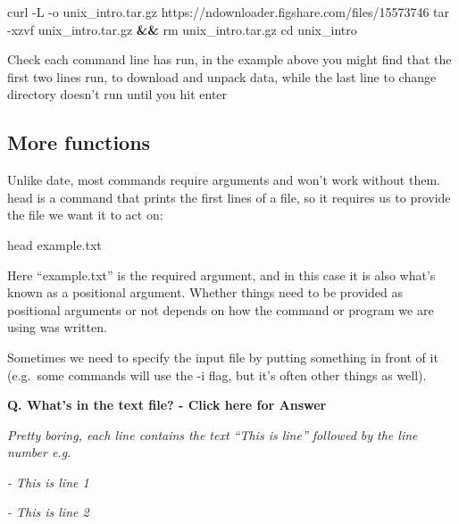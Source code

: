 \documentclass[
]{book}
\makeatletter
\newenvironment{Shaded}{\begin{snugshade}}{\end{snugshade}}
\newcommand{\AttributeTok}[1]{\textcolor[rgb]{0.77,0.63,0.00}{#1}}
\newcommand{\BuiltInTok}[1]{#1}
\newcommand{\ExtensionTok}[1]{#1}
\newcommand{\FunctionTok}[1]{\textcolor[rgb]{0.00,0.00,0.00}{#1}}
\newcommand{\KeywordTok}[1]{\textcolor[rgb]{0.13,0.29,0.53}{\textbf{#1}}}
\newcommand{\NormalTok}[1]{#1}
\newenvironment{kframe}{%
\medskip{}
\setlength{\fboxsep}{.8em}
 \def\at@end@of@kframe{}%
 \ifinner\ifhmode%
  \def\at@end@of@kframe{\end{minipage}}%
  \begin{minipage}{\columnwidth}%
 \fi\fi%
 \def\FrameCommand##1{\hskip\@totalleftmargin \hskip-\fboxsep
 \colorbox{shadecolor}{##1}\hskip-\fboxsep
     \hskip-\linewidth \hskip-\@totalleftmargin \hskip\columnwidth}%
 \MakeFramed {\advance\hsize-\width
   \@totalleftmargin\z@ \linewidth\hsize
   \@setminipage}}%
 {\par\unskip\endMakeFramed%
 \at@end@of@kframe}
\newenvironment{block}[1]
  {
  \begin{itemize}
  \renewcommand{\labelitemi}{
    \raisebox{-.7\height}[0pt][0pt]{
      {\setkeys{Gin}{width=3em,keepaspectratio}\texttt{[image: images/\#1]}}
    }
  }
  \setlength{\fboxsep}{1em}
  \begin{kframe}
  \item
  }
  {
  \end{kframe}
  \end{itemize}
  }
\newenvironment{rmdwarning}
  {\begin{block}{warning}}
  {\end{block}}
\makeatother
\begin{document}
\begin{Shaded}
\begin{Highlighting}[]
    \ExtensionTok{curl} \AttributeTok{{-}L} \AttributeTok{{-}o}\NormalTok{ unix\_intro.tar.gz https://ndownloader.figshare.com/files/15573746}
    \FunctionTok{tar} \AttributeTok{{-}xzvf}\NormalTok{ unix\_intro.tar.gz }\KeywordTok{\&\&} \FunctionTok{rm}\NormalTok{ unix\_intro.tar.gz}
    \BuiltInTok{cd}\NormalTok{ unix\_intro}
\end{Highlighting}
\end{Shaded}

\begin{rmdwarning}
Check each command line has run, in the example above you might find
that the first two lines run, to download and unpack data, while the
last line to change directory doesn't run until you hit enter
\end{rmdwarning}

\hypertarget{more-functions}{%
\subsection{More functions}\label{more-functions}}

Unlike date, most commands require arguments and won't work without them. head is a command that prints the first lines of a file, so it requires us to provide the file we want it to act on:

\begin{Shaded}
\begin{Highlighting}[]
    \FunctionTok{head}\NormalTok{ example.txt}
\end{Highlighting}
\end{Shaded}

Here ``example.txt'' is the required argument, and in this case it is also what's known as a positional argument. Whether things need to be provided as positional arguments or not depends on how the command or program we are using was written.

Sometimes we need to specify the input file by putting something in front of it (e.g.~some commands will use the -i flag, but it's often other things as well).

\textbf{Q. What's in the text file? - Click here for Answer}

\emph{Pretty boring, each line contains the text ``This is line'' followed by the line number e.g.}

\emph{- This is line 1}

\emph{- This is line 2}
\end{document}
